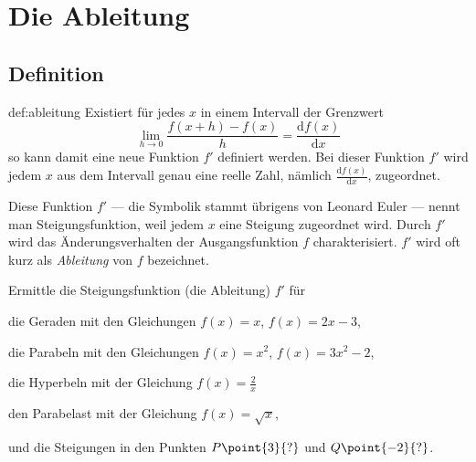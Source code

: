 \documentclass[%
11pt,%
twoside,%
titlepage,%
german,%
headsepline%
]{scrartcl}
\begin{document}
\clearpage

\section{Die Ableitung}
\subsection{Definition}

\begin{cdef}[Ableitung]{def:ableitung}
Existiert f\"ur jedes $x$ in einem Intervall der Grenzwert
$$\lim_{h\to0}\frac{f(x+h)-f(x)}{h}=\frac{\mathrm{d}f(x)}{\mathrm{d}x}$$
so kann damit eine neue Funktion $f'$ definiert werden. Bei dieser Funktion $f'$ wird jedem $x$ aus dem Intervall genau eine reelle Zahl, n\"amlich $\frac{\mathrm{d}f(x)}{\mathrm{d}x}$, zugeordnet.

Diese Funktion $f'$ --- die Symbolik stammt \"ubrigens von Leonard Euler --- nennt man Steigungsfunktion, weil jedem $x$ eine Steigung zugeordnet wird. Durch $f'$ wird das \"Anderungsverhalten der Ausgangsfunktion $f$ charakterisiert. $f'$ wird oft kurz als \emph{Ableitung} von $f$ bezeichnet.
\end{cdef}

\begin{ueb}[Steigungsfunktion]\label{uebsteigungsfunktion}
Ermittle
die Steigungsfunktion (die Ableitung) $f'$ f\"ur
\begin{enumeratea}
\item die Geraden mit den Gleichungen $f(x)=x$, $f(x)=2x-3$,
\item die Parabeln mit den Gleichungen $f(x)=x^2$, $f(x)=3x^2-2$,
\item die Hyperbeln mit der Gleichung $f(x)=\frac{2}{x}$
\item den Parabelast mit der Gleichung $f(x)=\sqrt{x}$,
\end{enumeratea}
und die Steigungen in den Punkten $P\point{3}{?}$ und $Q\point{-2}{?}$.
\end{ueb}
\end{document}
